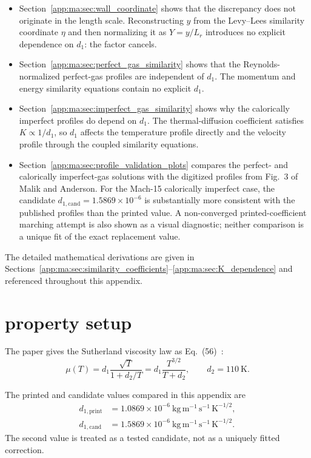 \begin{itemize}
    \item Section~\ref{app:ma:sec:wall_coordinate} shows that the discrepancy does not originate in the length scale. Reconstructing $y$ from the Levy--Lees similarity coordinate $\eta$ and then normalizing it as $Y=y/L_r$ introduces no explicit dependence on $d_1$: the factor cancels.
    \item Section~\ref{app:ma:sec:perfect_gas_similarity} shows that the Reynolds-normalized perfect-gas profiles are independent of $d_1$. The momentum and energy similarity equations contain no explicit $d_1$.
    \item Section~\ref{app:ma:sec:imperfect_gas_similarity} shows why the calorically imperfect profiles do depend on $d_1$. The thermal-diffusion coefficient satisfies $K\propto 1/d_1$, so $d_1$ affects the temperature profile directly and the velocity profile through the coupled similarity equations.
    \item Section~\ref{app:ma:sec:profile_validation_plots} compares the perfect- and calorically imperfect-gas solutions with the digitized profiles from Fig.~3 of Malik and Anderson. For the Mach-15 calorically imperfect case, the candidate $d_{1,\mathrm{cand}}=1.5869\times10^{-6}$ is substantially more consistent with the published profiles than the printed value. A non-converged printed-coefficient marching attempt is also shown as a visual diagnostic; neither comparison is a unique fit of the exact replacement value.
\end{itemize}

The detailed mathematical derivations are given in Sections~\ref{app:ma:sec:similarity_coefficients}--\ref{app:ma:sec:K_dependence} and referenced throughout this appendix.

\section{\maAppName{} property setup}
\label{app:ma:sec:property_setup}

The paper gives the Sutherland viscosity law as Eq.~(56)~\cite{MalikAnderson1991RealGas}:
\begin{equation}
  \mu(T)
  = d_1 \frac{\sqrt{T}}{1+d_2/T}
  = d_1 \frac{T^{3/2}}{T+d_2},
  \qquad d_2 = 110~\mathrm{K}.
  \label{app:ma:eq:sutherland}
\end{equation}

The printed and candidate values compared in this appendix are
\begin{align}
  d_{1,\mathrm{print}}&=1.0869\times10^{-6}~\mathrm{kg\,m^{-1}\,s^{-1}\,K^{-1/2}},\\
  d_{1,\mathrm{cand}}&=1.5869\times10^{-6}~\mathrm{kg\,m^{-1}\,s^{-1}\,K^{-1/2}}.
\end{align}
The second value is treated as a tested candidate, not as a uniquely fitted correction.

